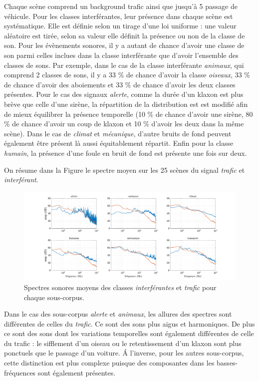 Chaque scène comprend un background trafic ainsi que jusqu'à 5 passage de véhicule.
Pour les classes interférantes, leur présence dans chaque scène est systématique. Elle est définie selon un tirage d'une loi uniforme : une valeur aléatoire est tirée, selon sa valeur elle définit la présence ou non de la classe de son. Pour les évènements sonores, il y a autant de chance d'avoir une classe de son parmi celles inclues dans la classe interférante que d'avoir l'ensemble des classes de sons. Par exemple, dans le cas de la classe interférante \textit{animaux}, qui comprend 2 classes de sons, il y a 33 $\%$ de chance d'avoir la classe \textit{oiseaux}, 33 $\%$ de chance d'avoir des aboiements et 33 $\%$ de chance d'avoir les deux classes présentes. Pour le cas des signaux \textit{alerte}, comme la durée d'un klaxon est plus brève que celle d'une sirène, la répartition de la distribution est est modifié afin de mieux équilibrer la présence temporelle (10 $\%$ de chance d'avoir une sirène, 80 $\%$ de chance d'avoir un coup de klaxon et 10 $\%$ d'avoir les deux dans la même scène).
Dans le cas de \textit{climat} et \textit{mécanique}, d'autre bruits de fond peuvent également être présent là aussi équitablement répartit. Enfin pour la classe \textit{humain}, la présence d'une foule en bruit de fond est présente une fois sur deux. 

On résume dans la Figure le spectre moyen sur les 25 scènes du signal \textit{trafic} et \textit{interférant}.

\begin{figure}[ht]
\centering
\includegraphics[width=\linewidth]{./figures/NMF/spectre_ambiance.pdf}
\caption{Spectres sonores moyens des classes \textit{interférantes} et \textit{trafic} pour chaque sous-corpus.}
\end{figure}


Dans le cas des sous-corpus \textit{alerte} et \textit{animaux}, les allures des spectres sont différentes de celles du \textit{trafic}. Ce sont des sons plus aigus et harmoniques. De plus ce sont des sons dont les variations temporelles sont également différentes de celle du trafic : le sifflement d'un oiseau ou le retentissement d'un klaxon sont plus ponctuels que le passage d'un voiture. \'A l'inverse, pour les autres sous-corpus, cette distinction est plus complexe puisque des composantes dans les basses-fréquences sont également présentes.

